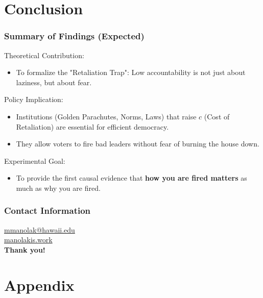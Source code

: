 \documentclass[10pt]{beamer}
\begin{document}
\section{Conclusion}

\begin{frame}
    \frametitle{Summary of Findings (Expected)}
    Theoretical Contribution:
    \begin{itemize}
        \item To formalize the "\textcolor{Lehua}{Retaliation Trap}": Low accountability is not just about laziness, but about \textcolor{Lehua}{fear}.
    \end{itemize}
    Policy Implication:
    \begin{itemize}
        \item Institutions (Golden Parachutes, Norms, Laws) that \textcolor{Lai}{raise $c$ (Cost of Retaliation)} are essential for efficient democracy.
        \item They allow voters to fire bad leaders without fear of burning the house down.
    \end{itemize}
    Experimental Goal:
    \begin{itemize}
      \item To provide the first causal evidence that \textbf{\textcolor{Ilima}{how you are fired matters}} as much as why you are fired.
    \end{itemize}
\end{frame}

\begin{frame}
    \frametitle{Contact Information}
    \vfill
    \begin{center}
        \Large
        \href{mailto:mmanolak@hawaii.edu}{mmanolak@hawaii.edu} \\
        \href{https://manolakis.work/}{manolakis.work} \\[0.5cm]
        \textbf{Thank you!}
    \end{center}
    \vfill
\end{frame}



\appendix
\section[Appendix]{Appendix}
\end{document}
